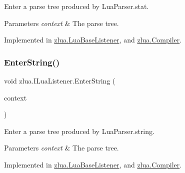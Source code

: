 Enter a parse tree produced by Lua\+Parser.\+stat. 


\begin{DoxyParams}{Parameters}
{\em context} & The parse tree.\\
\hline
\end{DoxyParams}


Implemented in \mbox{\hyperlink{classzlua_1_1_lua_base_listener_a863cb95dc744fd28f9194958e1d42341}{zlua.\+Lua\+Base\+Listener}}, and \mbox{\hyperlink{classzlua_1_1_compiler_a5edb39400f408df076c2ac83554f08eb}{zlua.\+Compiler}}.

\mbox{\label{interfacezlua_1_1_i_lua_listener_a47729a5ed96c8b8310250fae283584ec}} 
\subsubsection{\texorpdfstring{Enter\+String()}{EnterString()}}
{\footnotesize\ttfamily void zlua.\+I\+Lua\+Listener.\+Enter\+String (\begin{DoxyParamCaption}\item[{\mbox{[}\+Not\+Null\mbox{]} \mbox{\hyperlink{classzlua_1_1_lua_parser_1_1_string_context}{Lua\+Parser.\+String\+Context}}}]{context }\end{DoxyParamCaption})}



Enter a parse tree produced by Lua\+Parser.\+string. 


\begin{DoxyParams}{Parameters}
{\em context} & The parse tree.\\
\hline
\end{DoxyParams}


Implemented in \mbox{\hyperlink{classzlua_1_1_lua_base_listener_a98b2e77fa39477251ef47c023d51d559}{zlua.\+Lua\+Base\+Listener}}, and \mbox{\hyperlink{classzlua_1_1_compiler_a994696673f9c1c41e00d65b1e7bb1d39}{zlua.\+Compiler}}.

\mbox{\label{interfacezlua_1_1_i_lua_listener_a8e9361d3a88bf9fe02b6be1b7aa3f066}} 
